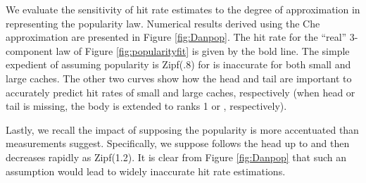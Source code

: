 \documentclass [11pt]{article}
\begin{document}
We evaluate the sensitivity of hit rate estimates to the degree of approximation in representing the popularity law. Numerical results derived using the Che approximation are presented in Figure \ref{fig:Danpop}. The hit rate for the ``real'' 3-component law of Figure \ref{fig:popularityfit} is given by the bold line. The simple expedient of assuming popularity is Zipf(.8) for  is inaccurate for both small and large caches. The other two curves show how the head and tail are important to accurately predict hit rates of small and large caches, respectively (when head or tail is missing, the body is extended to ranks 1 or , respectively). 

Lastly, we recall the impact of supposing the popularity is more accentuated than measurements suggest. Specifically, we suppose  follows the head up to  and then decreases rapidly as Zipf(1.2).  It is clear from Figure \ref{fig:Danpop} that such an assumption would lead to widely inaccurate hit rate estimations.
\end{document}
